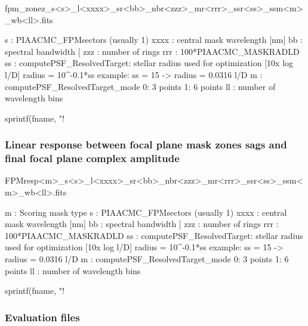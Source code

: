 \begin{DoxyVerb}fpm_zonez_s<s>_l<xxxx>_sr<bb>_nbr<zzz>_mr<rrr>_ssr<ss>_ssm<m>_wb<ll>.fits


s    : PIAACMC_FPMsectors (usually 1)
xxxx : central mask wavelength [nm]
bb   : spectral bandwidth [%
zzz  : number of rings
rrr  : 100*PIAACMC_MASKRADLD
ss   : computePSF_ResolvedTarget: stellar radius used for optimization  [10x log l/D]
    radius = 10^{-0.1*ss}
    example: ss = 15  ->  radius = 0.0316 l/D
m    : computePSF_ResolvedTarget_mode
    0: 3 points
    1: 6 points
ll   : number of wavelength bins


sprintf(fname, "!%


\subsubsection*{Linear response between focal plane mask zones sags and final focal plane complex amplitude}

\begin{DoxyVerb}FPMresp<m>_s<s>_l<xxxx>_sr<bb>_nbr<zzz>_mr<rrr>_ssr<ss>_ssm<m>_wb<ll>.fits

m    : Scoring mask type
s    : PIAACMC_FPMsectors (usually 1)
xxxx : central mask wavelength [nm]
bb   : spectral bandwidth [%
zzz  : number of rings
rrr  : 100*PIAACMC_MASKRADLD
ss   : computePSF_ResolvedTarget: stellar radius used for optimization  [10x log l/D]
    radius = 10^{-0.1*ss}
    example: ss = 15  ->  radius = 0.0316 l/D
m    : computePSF_ResolvedTarget_mode
    0: 3 points
    1: 6 points
ll   : number of wavelength bins


sprintf(fname, "!%


\subsubsection*{Evaluation files}


\end{DoxyVerb}
\end{DoxyVerb}
